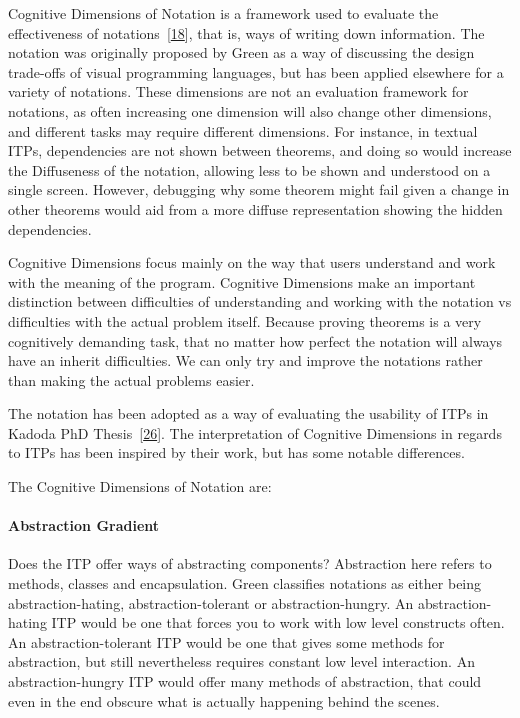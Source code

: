 \documentclass[
]{article}
\begin{document}
Cognitive Dimensions of Notation is a framework used to evaluate the
effectiveness of
notations~{[}\protect\hyperlink{ref-green_usability_1996}{18}{]}, that
is, ways of writing down information. The notation was originally
proposed by Green as a way of discussing the design trade-offs of visual
programming languages, but has been applied elsewhere for a variety of
notations. These dimensions are not an evaluation framework for
notations, as often increasing one dimension will also change other
dimensions, and different tasks may require different dimensions. For
instance, in textual ITPs, dependencies are not shown between theorems,
and doing so would increase the Diffuseness of the notation, allowing
less to be shown and understood on a single screen. However, debugging
why some theorem might fail given a change in other theorems would aid
from a more diffuse representation showing the hidden dependencies.

Cognitive Dimensions focus mainly on the way that users understand and
work with the meaning of the program. Cognitive Dimensions make an
important distinction between difficulties of understanding and working
with the notation vs difficulties with the actual problem itself.
Because proving theorems is a very cognitively demanding task, that no
matter how perfect the notation will always have an inherit
difficulties. We can only try and improve the notations rather than
making the actual problems easier.

The notation has been adopted as a way of evaluating the usability of
ITPs in Kadoda PhD
Thesis~{[}\protect\hyperlink{ref-kadoda_desirable_1999}{26}{]}. The
interpretation of Cognitive Dimensions in regards to ITPs has been
inspired by their work, but has some notable differences.

The Cognitive Dimensions of Notation are:

\hypertarget{abstraction-gradient}{%
\paragraph{Abstraction Gradient}\label{abstraction-gradient}}

Does the ITP offer ways of abstracting components? Abstraction here
refers to methods, classes and encapsulation. Green classifies notations
as either being abstraction-hating, abstraction-tolerant or
abstraction-hungry. An abstraction-hating ITP would be one that forces
you to work with low level constructs often. An abstraction-tolerant ITP
would be one that gives some methods for abstraction, but still
nevertheless requires constant low level interaction. An
abstraction-hungry ITP would offer many methods of abstraction, that
could even in the end obscure what is actually happening behind the
scenes.
\end{document}
